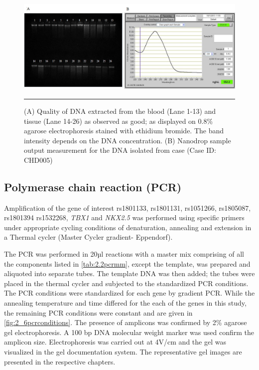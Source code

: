 \begin{refsection}
\begin{figure}[!tb]
\centering
\includegraphics[width=\linewidth]{Figures/2_5DNAqlty.pdf} 
\rule{35em}{0.5pt}
\caption{(A) Quality of DNA extracted from the blood (Lane 1-13) and tissue (Lane 14-26)  as observed as good; as displayed on 0.8\% agarose electrophoresis stained with ethidium bromide. The band intensity depends on the DNA concentration. (B) Nanodrop sample output measurement for the DNA isolated from case (Case ID: CHD005)}
\label{fig:2_5DNAqlty}
\end{figure}

\subsection{Polymerase chain reaction (PCR)}
Amplification of the gene of interest rs1801133, rs1801131, rs1051266, rs1805087, rs1801394  rs1532268, \textit{TBX1} and \textit{NKX2.5} was performed using specific primers under appropriate cycling conditions of denaturation, annealing and extension in a Thermal cycler (Master Cycler gradient- Eppendorf).

The PCR was performed in 20µl reactions with a master mix comprising of all the components listed in \cref{tab:2.2pcrmm}, except the template, was prepared and aliquoted into separate tubes. The template DNA was then added; the tubes were placed in the thermal cycler and subjected to the standardized PCR conditions. The PCR conditions were standardized for each gene by gradient PCR. While the annealing temperature and time differed for the each of the genes in this study, the remaining PCR conditions were constant and are given in \cref{fig:2_6pcrconditions}. The presence of amplicons was confirmed by 2\% agarose gel electrophoresis. A 100 bp DNA molecular weight marker was used confirm the amplicon size. Electrophoresis was carried out at 4V/cm and the gel was visualized in the gel documentation system. The representative gel images are presented in the respective chapters.


\end{refsection}
